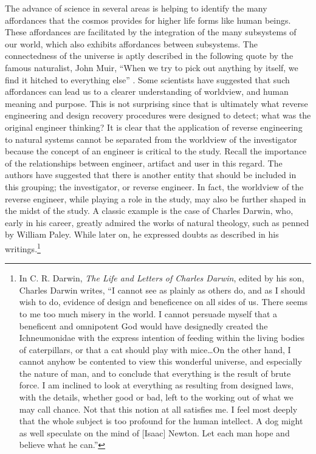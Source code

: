 The advance of science in several areas is helping to identify the many
affordances that the cosmos provides for higher life forms like human
beings.\citep{barrow2008} These affordances are facilitated by the
integration of the many subsystems of our world, which also exhibits
affordances between subsystems. The connectedness of the universe is
aptly described in the following quote by the famous naturalist, John
Muir, “When we try to pick out anything by itself, we find it hitched
to everything else” \citep[][pg. 110]{muir1988}. Some scientists have suggested
that such affordances can lead us to a clearer understanding of
worldview, and human meaning and purpose.\citep{denton1998} This is
not surprising since that is ultimately what reverse engineering and
design recovery procedures were designed to detect; what was the
original engineer thinking? It is clear that the application of reverse
engineering to natural systems cannot be separated from the worldview
of the investigator because the concept of an engineer is critical to
the study. Recall the importance of the relationships between engineer,
artifact and user in this regard. The authors have suggested that there
is another entity that should be included in this grouping; the
investigator, or reverse engineer. In fact, the worldview of the
reverse engineer, while playing a role in the study, may also be
further shaped in the midst of the study. A classic example is the case
of Charles Darwin, who, early in his career, greatly admired the works
of natural theology, such as penned by William Paley. While later on,
he expressed doubts as described in his writings.\footnote{
In C. R. Darwin, \textit{The Life and Letters of
Charles Darwin}, edited by his son, Charles Darwin writes, ``I cannot see as plainly as others do,
and as I should wish to do, evidence of design and beneficence on all
sides of us. There seems to me too much misery in the world.  I cannot
persuade myself that a beneficent and omnipotent God would have
designedly created the Ichneumonidae with the express intention of
feeding within the living bodies of caterpillars, or that a cat should
play with mice…On the other hand, I cannot anyhow be contented to view
this wonderful universe, and especially the nature of man, and to
conclude that everything is the result of brute force. I am inclined to
look at everything as resulting from designed laws, with the details,
whether good or bad, left to the working out of what we may call
chance. Not that this notion at all satisfies me. I feel most deeply
that the whole subject is too profound for the human intellect. A dog
might as well speculate on the mind of [Isaac] Newton. Let each man
hope and believe what he can.''\citep{darwinll}
}

